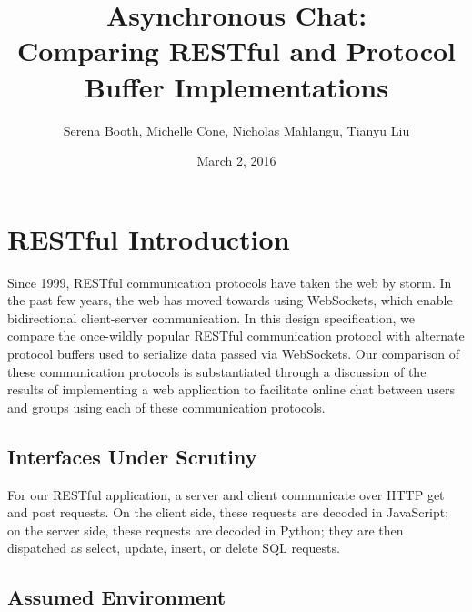 \documentclass[11pt]{article} %
\title{Asynchronous Chat: \\ Comparing RESTful and Protocol Buffer Implementations}
\author{Serena Booth, Michelle Cone, Nicholas Mahlangu, Tianyu Liu}
\date{March 2, 2016} %
\begin{document}
\maketitle


\section{RESTful Introduction}

Since 1999, RESTful communication protocols have taken the web by storm. In the past few years, the web has moved towards using WebSockets, which enable bidirectional client-server communication. In this design specification, we compare the once-wildly popular RESTful communication protocol with alternate protocol buffers used to serialize data passed via WebSockets. Our comparison of these communication protocols is substantiated through a discussion of the results of implementing a web application to facilitate online chat between users and groups using each of these communication protocols. 


\subsection{Interfaces Under Scrutiny}

For our RESTful application, a server and client communicate over HTTP get and post requests. On the client side, these requests are decoded in JavaScript; on the server side, these requests are decoded in Python; they are then dispatched as select, update, insert, or delete SQL requests. 

\subsection{Assumed Environment}
\end{document}
